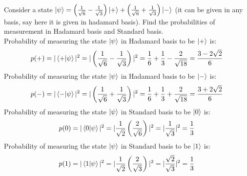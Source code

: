 \begin{example}
    Consider a state $\ket{\psi}=\left(\frac{1}{\sqrt{6}}-\frac{1}{\sqrt{3}}\right)\ket{+}+\left(\frac{1}{\sqrt{6}}+\frac{1}{\sqrt{3}}\right)\ket{-}$ (it can be given in any basis, say here it is given in hadamard basis).
    Find the probabilities of measurement in Hadamard basis and Standard basis.\\
    Probability of measuring the state $\ket{\psi}$ in Hadamard basis to be $\ket{+}$ is:
    \[
        p(+)=|\braket{+|\psi}|^2=|\left(\frac{1}{\sqrt{6}}-\frac{1}{\sqrt{3}}\right)|^2=\frac{1}{6}+\frac{1}{3}-\frac{2}{\sqrt{18}}=\frac{3-2\sqrt{2}}{6}
    \]
    Probability of measuring the state $\ket{\psi}$ in Hadamard basis to be $\ket{-}$ is:
    \[
        p(-)=|\braket{-|\psi}|^2=|\left(\frac{1}{\sqrt{6}}+\frac{1}{\sqrt{3}}\right)|^2=\frac{1}{6}+\frac{1}{3}+\frac{2}{\sqrt{18}}=\frac{3+2\sqrt{2}}{6}
    \]
    Probability of measuring the state $\ket{\psi}$ in Standard basis to be $\ket{0}$ is:
    \[
        p(0)=|\braket{0|\psi}|^2=|\frac{1}{\sqrt{2}}\left(\frac{2}{\sqrt{6}}\right)|^2=|\frac{1}{\sqrt{3}}|^2=\frac{1}{3}
    \]
    Probability of measuring the state $\ket{\psi}$ in Standard basis to be $\ket{1}$ is:
    \[
        p(1)=|\braket{1|\psi}|^2=|\frac{1}{\sqrt{2}}\left(\frac{2}{\sqrt{3}}\right)|^2=|\frac{\sqrt{2}}{\sqrt{3}}|^2=\frac{1}{3}
    \]
\end{example}

